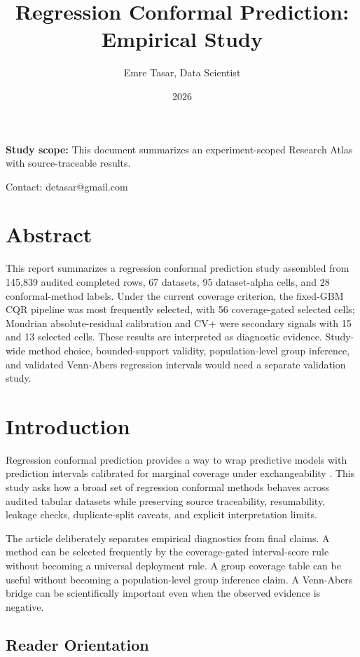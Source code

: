 \documentclass[11pt]{article}
\title{Regression Conformal Prediction: Empirical Study}
\author{Emre Tasar, Data Scientist}
\date{2026}
\begin{document}
\maketitle
\noindent\textbf{Study scope:} This document summarizes an experiment-scoped Research Atlas with source-traceable results.

Contact: detasar@gmail.com

\section{Abstract}

This report summarizes a regression conformal prediction study assembled from 145,839 audited completed rows, 67 datasets, 95 dataset-alpha cells, and 28 conformal-method labels. Under the current coverage criterion, the fixed-GBM CQR pipeline was most frequently selected, with 56 coverage-gated selected cells; Mondrian absolute-residual calibration and CV+ were secondary signals with 15 and 13 selected cells. These results are interpreted as diagnostic evidence. Study-wide method choice, bounded-support validity, population-level group inference, and validated Venn-Abers regression intervals would need a separate validation study.

\section{Introduction}

Regression conformal prediction provides a way to wrap predictive models with prediction intervals calibrated for marginal coverage under exchangeability \cite{lei2017distribution_free_regression}. This study asks how a broad set of regression conformal methods behaves across audited tabular datasets while preserving source traceability, resumability, leakage checks, duplicate-split caveats, and explicit interpretation limits.

The article deliberately separates empirical diagnostics from final claims. A method can be selected frequently by the coverage-gated interval-score rule without becoming a universal deployment rule. A group coverage table can be useful without becoming a population-level group inference claim. A Venn-Abers bridge can be scientifically important even when the observed evidence is negative.

\subsection{Reader Orientation}
\end{document}
